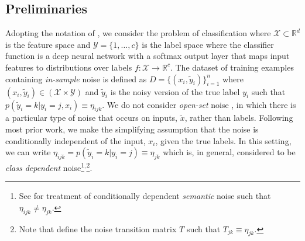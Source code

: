 \documentclass{article}
\begin{document}
\subsection{Preliminaries}
\label{sec:prelim}
Adopting the notation of \cite{zhang2018}, we consider the problem of classification where $\mathcal{X}\subset \mathbb{R}^d$ is the feature space and $\mathcal{Y} = \{1,\ldots,c\}$ is the label space where the classifier function is a deep neural network with a softmax output layer that maps input features to distributions over labels $f: \mathcal{X}\rightarrow \mathbb{R}^c$.  The dataset of training examples containing \emph{in-sample} noise is defined as $D = \{(x_i,\tilde{y}_i)\}^{n}_{i=1}$ where $(x_i,\tilde{y}_i) \in (\mathcal{X} \times \mathcal{Y})$ and $\tilde{y}_i$ is the noisy version of the true label $y_i$ such that $p(\tilde{y}_i=k\vert y_i = j,x_i) \equiv \eta_{ijk}$.  We do not consider \emph{open-set} noise \cite{wang2018}, in which there is a particular type of noise that occurs on inputs, $\tilde{x}$, rather than labels.  Following most prior work, we make the simplifying assumption that the noise is conditionally independent of the input, $x_i$, given the true labels. In this setting, we can write $\eta_{ijk}= p(\tilde{y}_i=k\vert y_i = j) \equiv \eta_{jk}$ which is, in general, considered to be \emph{class dependent} noise\footnote{See \cite{lee2019} for treatment of conditionally dependent \emph{semantic} noise such that $\eta_{ijk}\ne\eta_{jk}$.}$^\text{,}$\footnote{Note that \cite{patrini2016} define the noise transition matrix $T$ such that $T_{jk} \equiv \eta_{jk}$.}.
\end{document}
